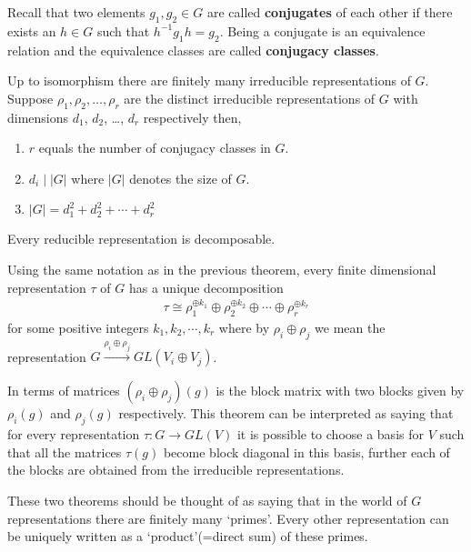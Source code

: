 Recall that two elements $g_1, g_2 \in G$ are called \textbf{conjugates} of each other if there exists an $h \in G$ such that $h^{-1} g_1 h = g_2$. Being a conjugate is an equivalence relation and the equivalence classes are called \textbf{conjugacy classes}.

\begin{thm} Up to isomorphism there are finitely many irreducible representations of $G$. Suppose $\rho_1, \rho_2, \ldots, \rho_r$ are the distinct irreducible representations of $G$ with dimensions $d_1$, $d_2$, \ldots, $d_r$ respectively then,
	$\quad$
	\begin{enumerate}
		\item $r$ equals the number of conjugacy classes in $G$.
		\item $d_i \mid |G|$ where $|G|$ denotes the size of $G$.
		\item $|G| = d_1^2 + d_2^2 + \cdots + d_r^2$
	\end{enumerate}
\end{thm}

\begin{thm}
	Every reducible representation is decomposable.
\end{thm}

\begin{thm}
	Using the same notation as in the previous theorem, every finite dimensional representation $\tau$ of $G$ has a unique decomposition
	\begin{align}
		\tau \cong \rho_1^{\oplus k_1} \oplus \rho_2^{\oplus k_2} \oplus \cdots \oplus \rho_r^{\oplus k_r}
	\end{align}
	for some positive integers $k_1, k_2, \cdots, k_r$ where by $\rho_i \oplus \rho_j$ we mean the representation $G \xrightarrow{\rho_i \oplus \rho_j} GL(V_i \oplus V_j)$.
\end{thm}
In terms of matrices $(\rho_i \oplus \rho_j)(g)$ is the block matrix with two blocks given by $\rho_i(g)$ and $\rho_j(g)$ respectively. This theorem can be interpreted as saying that for every representation $\tau: G \rightarrow GL(V)$ it is possible to choose a basis for $V$ such that all the matrices $\tau(g)$ become block diagonal in this basis, further each of the blocks are obtained from the irreducible representations.

These two theorems should be thought of as saying that in the world of $G$ representations there are finitely many `primes'. Every other representation can be uniquely written as a `product'(=direct sum) of these primes.


